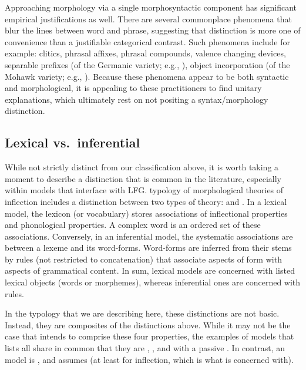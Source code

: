 \documentclass[output=paper,hidelinks]{langscibook}
\begin{document}
Approaching morphology via a single morphosyntactic component has
significant empirical justifications as well.  There are several
commonplace phenomena that blur the lines between word and phrase,
suggesting that distinction is more one of convenience than a
justifiable categorical contrast.  Such phenomena include for example:
clitics, phrasal affixes, phrasal compounds, valence changing devices,
separable prefixes (of the Germanic variety; e.g., \citealt{booij02}), object incorporation (of
the Mohawk variety; e.g., \citealt{Baker1988}).  Because these phenomena appear to be both syntactic
and morphological, it is appealing to these practitioners to find
unitary explanations, which ultimately rest on not positing a syntax/morphology distinction. 

\subsection{Lexical vs.\ inferential}
\label{sec:Morph:lexic-vs-infer}

While not strictly distinct from our classification above, it is worth
taking a moment to describe a distinction that is common in the literature,
especially within models that interface with LFG.   
typology of morphological theories of inflection includes a
distinction between two types of theory:   and .  In
a lexical model, the lexicon (or vocabulary) stores 
associations of inflectional properties and phonological properties. A
complex word is an ordered set of these associations.
Conversely, in an inferential model, the systematic associations are
between a lexeme and its word-forms.  Word-forms are inferred from their
stems by rules (not restricted to concatenation) that
associate aspects of form with aspects of grammatical content. In sum,
lexical models are concerned with listed lexical objects (words or
morphemes), whereas inferential ones are concerned with rules. 

In the typology that we are describing here, these distinctions are
not basic.  Instead, they are composites of the distinctions above.
While it may not be the case that \citet{Stu01} intends  to
comprise these four properties, the examples of  models that 
\citet{Stu01} lists all share in common that they are ,
, and  with a passive .  In
contrast, an  model is , and
assumes 
(at least for inflection, which is what \citealt{Stu01} is concerned with).
\end{document}

